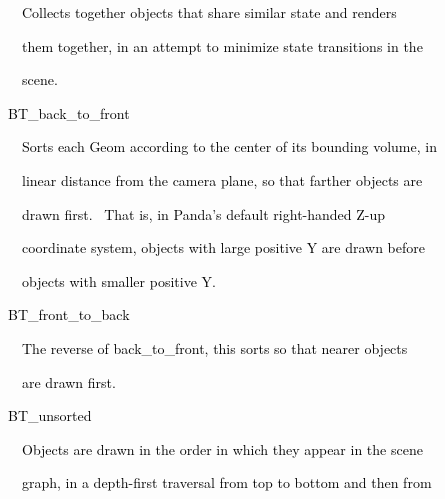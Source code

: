\documentclass[a4paper]{article}
\newcommand\textstyleOOoComputerKeyWord[1]{\textrm{\textcolor[rgb]{0.0,0.0,0.5019608}{#1}}}
\begin{document}
\bigskip

{\color{black}
\textstyleOOoComputerKeyWord{\textcolor{black}{\ \ \ \ Collects together objects that share similar state and renders}}}

{\color{black}
\textstyleOOoComputerKeyWord{\textcolor{black}{\ \ \ \ them together, in an attempt to minimize state transitions in
the}}}

{\color{black}
\textstyleOOoComputerKeyWord{\textcolor{black}{\ \ \ \ scene.}}}


\bigskip

{\color{black}
\textstyleOOoComputerKeyWord{\textcolor{black}{\ \ BT\_back\_to\_front}}}


\bigskip

{\color{black}
\textstyleOOoComputerKeyWord{\textcolor{black}{\ \ \ \ Sorts each Geom according to the center of its bounding volume,
in}}}

{\color{black}
\textstyleOOoComputerKeyWord{\textcolor{black}{\ \ \ \ linear distance from the camera plane, so that farther objects
are}}}

{\color{black}
\textstyleOOoComputerKeyWord{\textcolor{black}{\ \ \ \ drawn first. \ That is, in Panda's default right-handed Z-up}}}

{\color{black}
\textstyleOOoComputerKeyWord{\textcolor{black}{\ \ \ \ coordinate system, objects with large positive Y are drawn
before}}}

{\color{black}
\textstyleOOoComputerKeyWord{\textcolor{black}{\ \ \ \ objects with smaller positive Y.}}}


\bigskip

{\color{black}
\textstyleOOoComputerKeyWord{\textcolor{black}{\ \ BT\_front\_to\_back}}}


\bigskip

{\color{black}
\textstyleOOoComputerKeyWord{\textcolor{black}{\ \ \ \ The reverse of back\_to\_front, this sorts so that nearer
objects}}}

{\color{black}
\textstyleOOoComputerKeyWord{\textcolor{black}{\ \ \ \ are drawn first.}}}


\bigskip

{\color{black}
\textstyleOOoComputerKeyWord{\textcolor{black}{\ \ BT\_unsorted}}}


\bigskip

{\color{black}
\textstyleOOoComputerKeyWord{\textcolor{black}{\ \ \ \ Objects are drawn in the order in which they appear in the
scene}}}

{\color{black}
\textstyleOOoComputerKeyWord{\textcolor{black}{\ \ \ \ graph, in a depth-first traversal from top to bottom and then
from}}}
\end{document}
